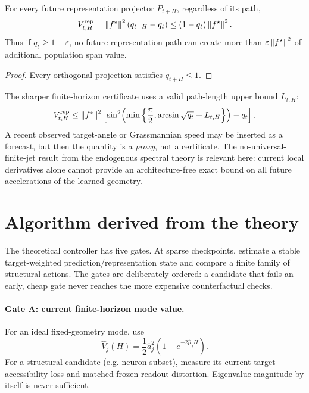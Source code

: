 \begin{proposition}\label{prop:saturation}
For every future representation projector $P_{t+H}$, regardless of its path,
\[
V^{\rm rep}_{t,H}
=\left\lVert f^\star\right\rVert^2(q_{t+H}-q_t)
\le
(1-q_t)\left\lVert f^\star\right\rVert^2.
\]
Thus if $q_t\ge1-\varepsilon$, no future representation path can create more than $\varepsilon\left\lVert f^\star\right\rVert^2$ of additional population span value.
\end{proposition}

\begin{proof}
Every orthogonal projection satisfies $q_{t+H}\le1$.
\end{proof}

The sharper finite-horizon certificate uses a valid path-length upper bound $L_{t,H}$:
\[
V^{\rm rep}_{t,H}
\le
\left\lVert f^\star\right\rVert^2
\left[
\sin^2\!\left(
\min\left\{\frac\pi2,\arcsin\sqrt{q_t}+L_{t,H}\right\}
\right)-q_t
\right].
\]
A recent observed target-angle or Grassmannian speed may be inserted as a forecast, but then the quantity is a \emph{proxy}, not a certificate. The no-universal-finite-jet result from the endogenous spectral theory is relevant here: current local derivatives alone cannot provide an architecture-free exact bound on all future accelerations of the learned geometry.

\section{Algorithm derived from the theory}
The theoretical controller has five gates. At sparse checkpoints, estimate a stable target-weighted prediction/representation state and compare a finite family of structural actions. The gates are deliberately ordered: a candidate that fails an early, cheap gate never reaches the more expensive counterfactual checks.

\paragraph{Gate A: current finite-horizon mode value.}
For an ideal fixed-geometry mode, use
\[
\widehat V_j(H)=\frac12\widehat a_j^2
\left(1-e^{-2\widehat\mu_jH}\right).
\]
For a structural candidate (e.g. neuron subset), measure its current target-accessibility loss and matched frozen-readout distortion. Eigenvalue magnitude by itself is never sufficient.

